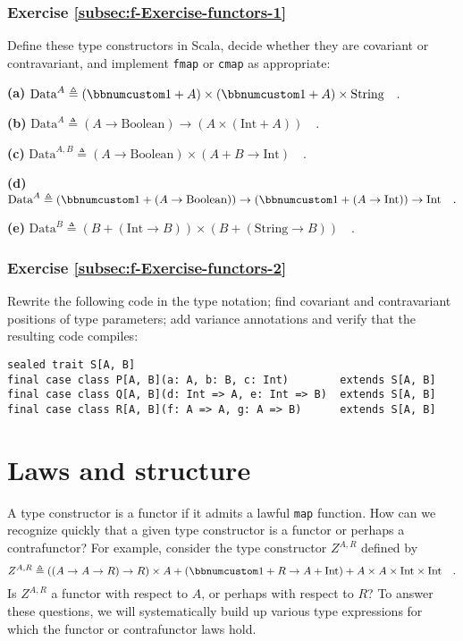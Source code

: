 \subsubsection{Exercise \label{subsec:f-Exercise-functors-1}\ref{subsec:f-Exercise-functors-1}}

Define these type constructors in Scala, decide whether they are covariant
or contravariant, and implement \lstinline!fmap! or \lstinline!cmap!
as appropriate:

\textbf{(a)} $\text{Data}^{A}\triangleq\left(\bbnum 1+A\right)\times\left(\bbnum 1+A\right)\times\text{String}\quad.$

\textbf{(b)} $\text{Data}^{A}\triangleq(A\rightarrow\text{Boolean})\rightarrow\left(A\times\left(\text{Int}+A\right)\right)\quad.$

\textbf{(c)} $\text{Data}^{A,B}\triangleq(A\rightarrow\text{Boolean})\times\left(A+B\rightarrow\text{Int}\right)\quad.$

\textbf{(d)} $\text{Data}^{A}\triangleq(\bbnum 1+(A\rightarrow\text{Boolean}))\rightarrow(\bbnum 1+(A\rightarrow\text{Int}))\rightarrow\text{Int}\quad.$

\textbf{(e)} $\text{Data}^{B}\triangleq(B+(\text{Int}\rightarrow B))\times(B+(\text{String}\rightarrow B))\quad.$

\subsubsection{Exercise \label{subsec:f-Exercise-functors-2}\ref{subsec:f-Exercise-functors-2}}

Rewrite the following code in the type notation; find covariant and
contravariant positions of type parameters; add variance annotations
and verify that the resulting code compiles:

\begin{lstlisting}
sealed trait S[A, B]
final case class P[A, B](a: A, b: B, c: Int)        extends S[A, B]
final case class Q[A, B](d: Int => A, e: Int => B)  extends S[A, B]
final case class R[A, B](f: A => A, g: A => B)      extends S[A, B]
\end{lstlisting}


\section{Laws and structure\label{sec:f-Laws-and-structure}}

A type constructor is a functor if it admits a lawful \lstinline!map!
function. How can we recognize quickly that a given type constructor
is a functor or perhaps a contrafunctor? For example, consider the
type constructor $Z^{A,R}$ defined by 
\begin{equation}
Z^{A,R}\triangleq\left(\left(A\rightarrow A\rightarrow R\right)\rightarrow R\right)\times A+\left(\bbnum 1+R\rightarrow A+\text{Int}\right)+A\times A\times\text{Int}\times\text{Int}\quad.\label{eq:f-example-complicated-z}
\end{equation}
Is $Z^{A,R}$ a functor with respect to $A$, or perhaps with respect
to $R$? To answer these questions, we will systematically build up
various type expressions for which the functor or contrafunctor laws
hold. 

